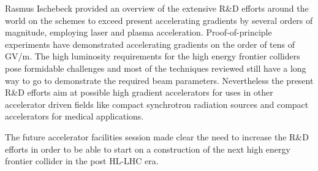 \noindent Rasmus Ischebeck provided an overview of the extensive R\&D efforts
around the world on the schemes to exceed present accelerating
gradients by several orders of magnitude, employing laser and plasma
acceleration. Proof-of-principle experiments have demonstrated
accelerating gradients on the order of tens of GV/m. The high
luminosity requirements for the high energy frontier colliders pose
formidable challenges and most of the techniques reviewed still have a
long way to go to demonstrate the required beam
parameters. Nevertheless the present R\&D efforts aim at possible high
gradient accelerators for uses in other accelerator driven fields like
compact synchrotron radiation sources and compact accelerators for
medical applications.
\medskip

\noindent The future accelerator facilities session made clear the need to
increase the R\&D efforts in order to be able to start on a
construction of the next high energy frontier collider in the post
HL-LHC era.




